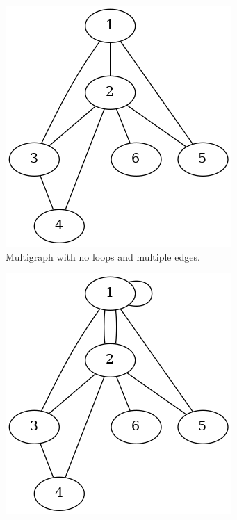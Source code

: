 \begin{figure}
     \begin{subfigure}[t]{0.4\textwidth}
         \centering
         \includegraphics[width=\textwidth]{Figures/chapter1/simple_graph_adj.png}
         \caption{Multigraph with no loops and multiple edges.}
         \label{fig:simple_adj_demo}
     \end{subfigure}
     \hfill
     \begin{subfigure}[t]{0.4\textwidth}
         \centering
         \includegraphics[width=\textwidth]{Figures/chapter1/complex_graph_adj.png}

\end{subfigure}
\end{figure}
